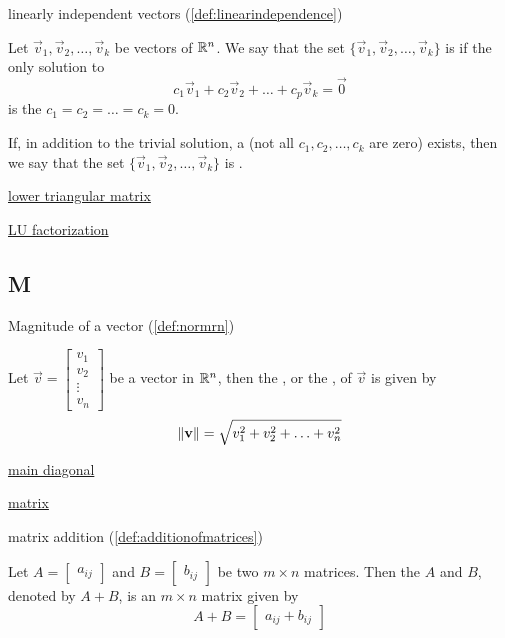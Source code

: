 \documentclass{ximera}
\begin{document}
linearly independent vectors (\ref{def:linearindependence})
\begin{expandable}
    Let $\vec{v}_1, \vec{v}_2,\ldots ,\vec{v}_k$ be vectors of $\mathbb{R}^n$.  We say that the set $\{\vec{v}_1, \vec{v}_2,\ldots ,\vec{v}_k\}$ is  if the only solution to 
\begin{equation}\label{eq:defLinInd}c_1\vec{v}_1+c_2\vec{v}_2+\ldots +c_p\vec{v}_k=\vec{0}\end{equation}
is the  $c_1=c_2=\ldots =c_k=0$.

If, in addition to the trivial solution, a  (not all $c_1, c_2,\ldots ,c_k$ are zero) exists, then we say that the set $\{\vec{v}_1, \vec{v}_2,\ldots ,\vec{v}_k\}$ is .
\end{expandable}

\href{https://ximera.osu.edu/oerlinalg/LinearAlgebra/MAT-0070/main}{lower triangular matrix}

\href{https://ximera.osu.edu/oerlinalg/LinearAlgebra/MAT-0070/main}{LU factorization}

\subsection{M}
Magnitude of a vector (\ref{def:normrn})
\begin{expandable}
Let $\vec{v}=\begin{bmatrix}v_1\\ v_2\\ \vdots \\v_n\end{bmatrix}$ be a vector in $\mathbb{R}^n$, then the , or the , of $\vec{v}$ is given by
$$  \left\lVert\mathbf{v}\right\rVert=\sqrt{v_1^2+v_2^2+\ldots +v_n^2}$$
\end{expandable}

\href{https://ximera.osu.edu/oerlinalg/LinearAlgebra/MAT-0010/main}{main diagonal}
    
\href{https://ximera.osu.edu/oerlinalg/LinearAlgebra/MAT-0010/main}{matrix}

matrix addition (\ref{def:additionofmatrices})
\begin{expandable}
    Let $A=\begin{bmatrix} a_{ij}\end{bmatrix} $ and $B=\begin{bmatrix} b_{ij}\end{bmatrix}$ be two
$m\times n$ matrices. Then the  $A$ and $B$, denoted by $A+B$,  is an $m \times n$
matrix  given by 
$$A+B=\begin{bmatrix}a_{ij}+b_{ij}\end{bmatrix}$$
\end{expandable}
\end{document}
